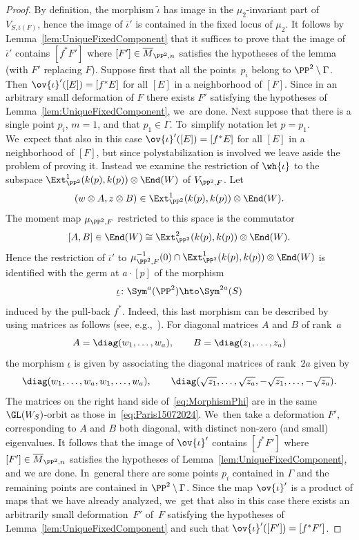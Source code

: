 \begin{proof}
By definition, the morphism $\widetilde{\iota}$ has image in the $\mu_2$-invariant part of $V_{S,\overline{\iota}(F)}$, hence the image of $\overline{\iota}'$ is contained in the fixed locus of $\mu_2$. It follows by Lemma~\ref{lem:UniqueFixedComponent} that it suffices to prove that the image of $\overline{\iota}'$ contains $[f^{*}F']$ where $[F']\in\overline{M}_{\PP^2,n}$ satisfies the hypotheses of the lemma (with $F'$ replacing $F$).
Suppose first that all the points~$p_i$ belong to $\PP^2\setminus\Gamma$. Then
$\ov{\iota}'([E])=[f^{*}E]$ for all $[E]$ in a neighborhood of $[F]$. Since in an arbitrary small deformation of $F$ there exists $F'$ satisfying the hypotheses of Lemma~\ref{lem:UniqueFixedComponent}, we~are done. Next suppose that there is a single point $p_i$, \ie $m=1$, and that $p_1\in\Gamma$. To~simplify notation let $p=p_1$. We~expect that also in this case
$\ov{\iota}'([E])=[f^{*}E]$ for all $[E]$ in a neighborhood of $[F]$, but since polystabilization is involved we leave aside the problem of proving it. Instead we examine the restriction of $\wh{\iota}$ to the subspace
$\Ext^1_{\PP^2}(k(p),k(p))\otimes \End(W)$ of $V_{\PP^2,F}$.
Let
\[
(w\otimes A,z\otimes B)\in\Ext^1_{\PP^2}(k(p),k(p))\otimes \End(W).
\]
The moment map $\mu_{\PP^2,F}$ restricted to this space is the commutator
\[
\left[A,B\right]\in\End(W)\cong\Ext^2_{\PP^2}(k(p),k(p))\otimes \End(W).
\]
Hence the restriction of $\overline{\iota}'$ to $\mu_{\PP^2,F}^{-1}(0)\cap \Ext^1_{\PP^2}(k(p),k(p))\otimes \End(W)$ is identified with the germ at $a\cdot [p]$ of the morphism
\[
\underline{\iota}\colon \Sym^{a}(\PP^2)\hto\Sym^{2a}(S)
\]
induced by the pull-back $f^*$.
Indeed, this last morphism can be described by using matrices as follows (see, e.g.,~\cite[\S 1.4]{Nakajima:book}).
For diagonal matrices $A$ and $B$ of rank~$a$
\[
A=\diag(w_1,\dots,w_a), \qquad B=\diag(z_1,\dots,z_a)
\]
the morphism $\underline{\iota}$ is given by associating the diagonal matrices of rank~$2a$ given by
\begin{equation}\label{eq:Paris15072024}
\diag(w_1,\dots,w_a,w_1,\dots,w_a), \qquad \diag(\sqrt{z_1},\dots,\sqrt{z_a},-\sqrt{z_1},\dots,-\sqrt{z_a}).
\end{equation}
The matrices on the right hand side of~\eqref{eq:MorphismPhi} are in the same $\GL(W_S)$-orbit as those in~\eqref{eq:Paris15072024}. We~then take a deformation $F'$, corresponding to $A$ and $B$ both diagonal, with distinct non-zero (and small) eigenvalues. It follows that the image of $\ov{\iota}'$ contains $[f^{*}F']$ where $[F']\in\overline{M}_{\PP^2,n}$ satisfies the hypotheses of
Lemma~\ref{lem:UniqueFixedComponent}, and we are done. In~general there are some points $p_i$ contained in $\Gamma$ and the remaining points are contained in $\PP^2\setminus\Gamma$. Since the map $\ov{\iota}'$ is a product of maps that we have already analyzed, we~get that also in this case there exists an arbitrarily small deformation~$F'$ of~$F$ satisfying the hypotheses of Lemma~\ref{lem:UniqueFixedComponent} and such that $\ov{\iota}'([F'])=[f^{*}F']$.
\end{proof}

